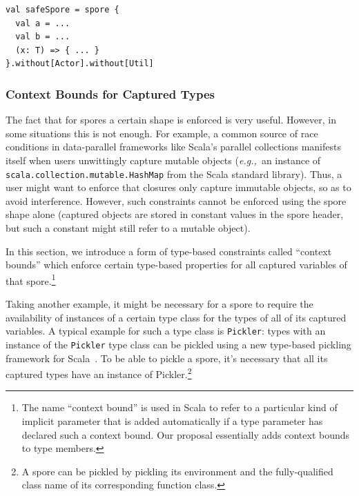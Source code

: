 \documentclass{llncs}
\newcommand{\eg}{{\em e.g.,~}}
\begin{document}
\begin{lstlisting}
val safeSpore = spore {
  val a = ...
  val b = ...
  (x: T) => { ... }
}.without[Actor].without[Util]
\end{lstlisting}

\subsubsection{Context Bounds for Captured Types}
\label{sec:context-bounds}

The fact that for spores a certain shape is enforced is very useful. However,
in some situations this is not enough. For example, a common source of race
conditions in data-parallel frameworks like Scala's parallel collections
manifests itself when users unwittingly capture mutable objects (\eg an
instance of \verb|scala.collection.mutable.HashMap| from the Scala standard
library). Thus, a user might want to enforce that closures only capture
immutable objects, so as to avoid interference. However, such constraints
cannot be enforced using the spore shape alone (captured objects are stored in
constant values in the spore header, but such a constant might still refer to
a mutable object).

In this section, we introduce a form of type-based constraints called
``context bounds'' which enforce certain type-based properties for all
captured variables of that spore.\footnote{The name ``context bound'' is used
in Scala to refer to a particular kind of implicit parameter that is added
automatically if a type parameter has declared such a context bound. Our
proposal essentially adds context bounds to type members.}

Taking another example, it might be necessary for a spore to require the
availability of instances of a certain type class for the types of all of its
captured variables. A typical example for such a type class is \verb|Pickler|:
types with an instance of the \verb|Pickler| type class can be pickled using a
new type-based pickling framework for Scala~\cite{ScalaPickling}. To be able
to pickle a spore, it's necessary that all its captured types have an instance
of Pickler.\footnote{A spore can be pickled by pickling its environment and
the fully-qualified class name of its corresponding function class.}
\end{document}
